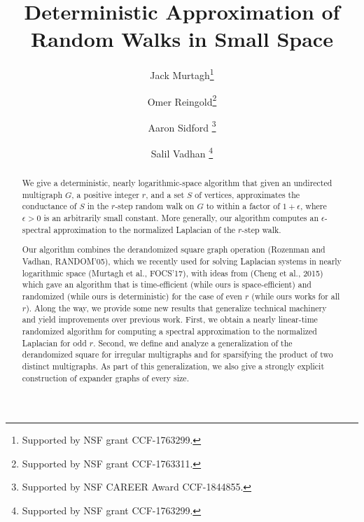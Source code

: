 \documentclass{toc}
\numberwithin{myalgctr}{section}
\theoremstyle{named}
\begin{document}
\begin{frontmatter} %
  
%
%

%
%

%
%
%

  \title{Deterministic Approximation of\\ Random Walks in Small Space}

%
%
%
%
%
%
%
%
%
%
%
%


%
%
%
%

%


\author[murtagh]{Jack Murtagh\thanks{Supported by NSF grant CCF-1763299.}}
\author[reingold]{Omer Reingold\thanks{Supported by NSF grant CCF-1763311.}}
\author[sidford]{Aaron Sidford \thanks{Supported by NSF CAREER Award CCF-1844855.}}
\author[vadhan]{Salil Vadhan \thanks{Supported by NSF grant CCF-1763299.}}

%
%
%
%

%
%
%
%
%
%
\begin{abstract}
We give a deterministic, nearly logarithmic-space algorithm that given an undirected multigraph $G$, a positive integer $r$, and a set $S$ of vertices, approximates the conductance of $S$ in the $r$-step random walk on $G$ to within a factor of $1+\epsilon$, where $\epsilon>0$ is an arbitrarily small constant. More generally, our algorithm computes an $\epsilon$-spectral approximation to the normalized Laplacian of the $r$-step walk.

Our algorithm combines the derandomized square graph operation (Rozenman and Vadhan, RANDOM'05), which we recently used for solving Laplacian systems in nearly logarithmic space (Murtagh et al., FOCS'17), with ideas from (Cheng et al., 2015)  %
which gave an algorithm that is time-efficient (while ours is space-efficient) and randomized (while ours is deterministic) for the case of even $r$ (while ours works for all $r$). Along the way, we provide some new results that generalize technical machinery and yield improvements over previous work.
First, we obtain a nearly linear-time randomized algorithm for computing a spectral approximation to the  normalized Laplacian for odd $r$. Second, we define and analyze a generalization of the derandomized square for irregular multigraphs and for sparsifying the product of two distinct multigraphs. As part of this generalization, we also give a strongly explicit construction of expander graphs of every size.
\end{abstract}

%

\end{frontmatter}
\end{document}

